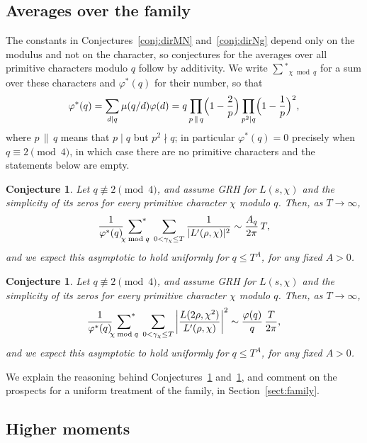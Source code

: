 \documentclass[12pt,a4paper,reqno]{amsart}
\newtheorem{conjecture}[theorem]{Conjecture}
\theoremstyle{remark}
\numberwithin{equation}{section}
\begin{document}
\subsection{Averages over the family}\label{subsect:families}
The constants in Conjectures~\ref{conj:dirMN} and~\ref{conj:dirNg} depend only on the modulus and not on the character, so conjectures for the averages over all primitive characters modulo $q$ follow by additivity. We write $\sum{^*}_{\chi\bmod q}$ for a sum over these characters and $\varphi^*(q)$ for their number, so that
\begin{equation}\label{eq:phistar}
\varphi^*(q)=\sum_{d\mid q}\mu(q/d)\varphi(d)=q\prod_{p\,\|\,q}\Bigl(1-\frac2p\Bigr)\prod_{p^2\mid q}\Bigl(1-\frac1p\Bigr)^{2},
\end{equation}
where $p\,\|\,q$ means that $p\mid q$ but $p^2\nmid q$; in particular $\varphi^*(q)=0$ precisely when $q\equiv2\pmod4$, in which case there are no primitive characters and the statements below are empty.

\begin{conjecture}\label{conj:famA}
Let $q\not\equiv2\pmod4$, and assume GRH for $L(s,\chi)$ and the simplicity of its zeros for every primitive character $\chi$ modulo $q$. Then, as $T\to\infty$,
\[
\frac{1}{\varphi^*(q)} \sideset{}{^*}\sum_{\chi\bmod q}\;\sum_{0<\gamma_\chi\le T}\frac{1}{|L'(\rho,\chi)|^2}\sim \frac{A_q}{2\pi}\,T,
\]
and we expect this asymptotic to hold uniformly for $q\le T^{A}$, for any fixed $A>0$.
\end{conjecture}

\begin{conjecture}\label{conj:famB}
Let $q\not\equiv2\pmod4$, and assume GRH for $L(s,\chi)$ and the simplicity of its zeros for every primitive character $\chi$ modulo $q$. Then, as $T\to\infty$,
\[
\frac{1}{\varphi^*(q)}  \sideset{}{^*}\sum_{\chi\bmod q}\;\sum_{0<\gamma_\chi\le T}\left|\frac{L(2\rho,\chi^2)}{L'(\rho,\chi)}\right|^2\sim \frac{\varphi(q)}{q}\,\frac{T}{2\pi},
\]
and we expect this asymptotic to hold uniformly for $q\le T^{A}$, for any fixed $A>0$.
\end{conjecture}

We explain the reasoning behind Conjectures~\ref{conj:famA} and~\ref{conj:famB}, and comment on the prospects for a uniform treatment of the family, in Section~\ref{sect:family}.

\subsection{Higher moments}\label{sec:higher}
\end{document}
